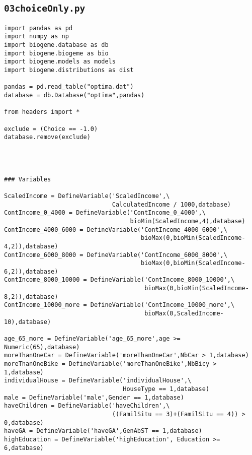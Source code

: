 \documentclass[12pt,a4paper]{article}
\begin{document}
\subsection{\lstinline$03choiceOnly.py$}
\label{sec:03choiceOnly}

\begin{lstlisting}[style=numbers]
import pandas as pd
import numpy as np
import biogeme.database as db
import biogeme.biogeme as bio
import biogeme.models as models
import biogeme.distributions as dist

pandas = pd.read_table("optima.dat")
database = db.Database("optima",pandas)

from headers import *

exclude = (Choice == -1.0)
database.remove(exclude)




### Variables

ScaledIncome = DefineVariable('ScaledIncome',\
                              CalculatedIncome / 1000,database)
ContIncome_0_4000 = DefineVariable('ContIncome_0_4000',\
                                   bioMin(ScaledIncome,4),database)
ContIncome_4000_6000 = DefineVariable('ContIncome_4000_6000',\
                                      bioMax(0,bioMin(ScaledIncome-4,2)),database)
ContIncome_6000_8000 = DefineVariable('ContIncome_6000_8000',\
                                      bioMax(0,bioMin(ScaledIncome-6,2)),database)
ContIncome_8000_10000 = DefineVariable('ContIncome_8000_10000',\
                                       bioMax(0,bioMin(ScaledIncome-8,2)),database)
ContIncome_10000_more = DefineVariable('ContIncome_10000_more',\
                                       bioMax(0,ScaledIncome-10),database)

age_65_more = DefineVariable('age_65_more',age >= Numeric(65),database)
moreThanOneCar = DefineVariable('moreThanOneCar',NbCar > 1,database)
moreThanOneBike = DefineVariable('moreThanOneBike',NbBicy > 1,database)
individualHouse = DefineVariable('individualHouse',\
                                 HouseType == 1,database)
male = DefineVariable('male',Gender == 1,database)
haveChildren = DefineVariable('haveChildren',\
                              ((FamilSitu == 3)+(FamilSitu == 4)) > 0,database)
haveGA = DefineVariable('haveGA',GenAbST == 1,database)
highEducation = DefineVariable('highEducation', Education >= 6,database)



\end{lstlisting}
\end{document}
